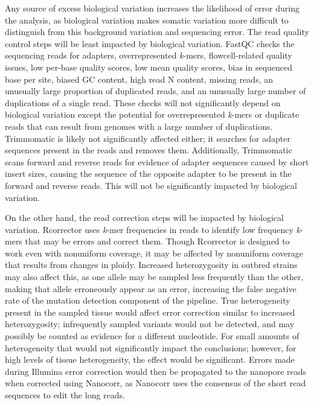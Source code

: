 Any source of excess biological variation increases the likelihood of error during the analysis, as biological variation makes somatic variation more difficult to distinguish from this background variation and sequencing error.
The read quality control steps will be least impacted by biological variation. FastQC checks the sequencing reads for adapters, overrepresented \textit{k}-mers, flowcell-related quality issues, low per-base quality scores, low mean quality scores, bias in sequenced base per site, biased GC content, high read N content, missing reads, an unusually large proportion of duplicated reads, and an unusually large number of duplications of a single read. These checks will not significantly depend on biological variation except the potential for overrepresented \textit{k}-mers or duplicate reads that can result from genomes with a large number of duplications. Trimmomatic is likely not significantly affected either; it searches for adapter sequences present in the reads and removes them. Additionally, Trimmomatic scans forward and reverse reads for evidence of adapter sequences caused by short insert sizes, causing the sequence of the opposite adapter to be present in the forward and reverse reads. This will not be significantly impacted by biological variation.


On the other hand, the read correction steps will be impacted by biological variation. Rcorrector uses \textit{k}-mer frequencies in reads to identify low frequency \textit{k}-mers that may be errors and correct them. Though Rcorrector is designed to work even with nonuniform coverage, it may be affected by nonuniform coverage that results from changes in ploidy. Increased heterozygosity in outbred strains may also affect this, as one allele may be sampled less frequently than the other, making that allele erroneously appear as an error, increasing the false negative rate of the mutation detection component of the pipeline. True heterogeneity present in the sampled tissue would affect error correction similar to increased heterozygosity; infrequently sampled variants would not be detected, and may possibly be counted as evidence for a different nucleotide. For small amounts of heterogeneity that would not significantly impact the conclusions; however, for high levels of tissue heterogeneity, the effect would be significant. Errors made during Illumina error correction would then be propagated to the nanopore reads when corrected using Nanocorr, as Nanocorr uses the consensus of the short read sequences to edit the long reads.


